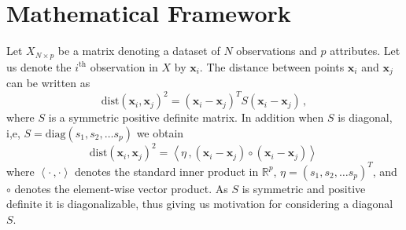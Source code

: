 \documentclass[11pt]{article}
\newcommand{\dist}{\text{dist}}
\newcommand{\diag}{\text{diag}}
\begin{document}
\section{Mathematical Framework}\label{sec:MathFrame}
Let $X_{N \times p}$ be a matrix denoting a dataset of $N$ observations and $p$ attributes. Let us denote the  $i^{\text{th}}$ observation in $X$ by $\bm{x}_i$. The  distance between points $\bm{x}_i$ and $\bm{x}_j$  can be written as 
\begin{equation}\label{eq:secMF1}
\dist(\bm{x}_i, \bm{x}_j)^2 = \left( \bm{x}_i - \bm{x}_j \right)^T S \left( \bm{x}_i - \bm{x}_j \right) \, , 
\end{equation}
where $S$ is a symmetric positive definite matrix.  In addition when $S$ is diagonal, i,e, $S = \diag(s_1, s_2, \ldots s_p)$ we obtain
\begin{equation}\label{eq:secMF2}
    \dist(\bm{x}_i, \bm{x}_j)^2 = \left\langle \eta\, ,  \left( \bm{x}_i - \bm{x}_j \right)\circ \left( \bm{x}_i - \bm{x}_j \right)  \right\rangle\, 
\end{equation}
where $\left\langle \cdot\, , \cdot \right\rangle$ denotes the standard inner product in $\mathbb{R}^p$,   $\eta = \left(s_1, s_2, \ldots s_p\right)^T$, and $\circ$ denotes the element-wise  vector product. As $S$ is symmetric and positive definite  it is diagonalizable, thus giving us motivation for considering a diagonal $S$. 
\end{document}
